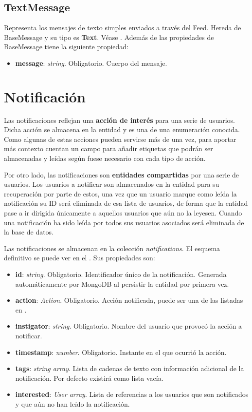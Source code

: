 \subsection{TextMessage}
\label{ssec:text_message}

Representa los mensajes de texto simples enviados a través del Feed. Hereda de BaseMessage y su tipo es \textbf{Text}. Véase . Además de las propiedades de BaseMessage tiene la siguiente propiedad:

\begin{itemize}
    \item \textbf{message}: \emph{string}. Obligatorio. Cuerpo del mensaje.
\end{itemize}

\section{Notificación}

Las notificaciones reflejan una \textbf{acción de interés} para una serie de usuarios. Dicha acción se almacena en la entidad y es una de una enumeración conocida. Como algunas de estas acciones pueden servirse más de una vez, para aportar más contexto cuentan un campo para añadir etiquetas que podrán ser almacenadas y leídas según fuese necesario con cada tipo de acción.

Por otro lado, las notificaciones son \textbf{entidades compartidas} por una serie de usuarios. Los usuarios a notificar son almacenados en la entidad para su recuperación por parte de estos, una vez que un usuario marque como leída la notificación su ID será eliminada de esa lista de usuarios, de forma que la entidad pase a ir dirigida únicamente a aquellos usuarios que aún no la leyesen. Cuando una notificación ha sido leída por todos sus usuarios asociados será eliminada de la base de datos.

Las notificaciones se almacenan en la colección \emph{notifications}. El esquema definitivo se puede ver en el . Sus propiedades son:

\begin{itemize}
    \item \textbf{id}: \emph{string}. Obligatorio. Identificador único de la notificación. Generada automáticamente por MongoDB al persistir la entidad por primera vez.
    \item \textbf{action}: \emph{Action}. Obligatorio. Acción notificada, puede ser una de las listadas en .
    \item \textbf{instigator}: \emph{string}. Obligatorio. Nombre del usuario que provocó la acción a notificar.
    \item \textbf{timestamp}: \emph{number}. Obligatorio. Instante en el que ocurrió la acción.
    \item \textbf{tags}: \emph{string array}. Lista de cadenas de texto con información adicional de la notificación. Por defecto existirá como lista vacía.
    \item \textbf{interested}: \emph{User array}. Lista de referencias a los usuarios que son notificados y que aún no han leído la notificación.
\end{itemize}

